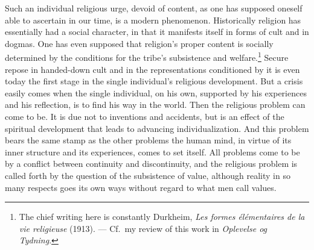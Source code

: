 \documentclass[12pt]{book}
\newcommand{\opage}[1]{\marginnote{\footnotesize\textit{[#1]}}}
\begin{document}
Such an individual religious urge, devoid of content, as one has supposed oneself able to ascertain in our
time, is a modern phenomenon. Historically religion has essentially had a social character, in that it manifests
itself in forms of cult and in dogmas. One has even supposed that religion's proper content is
socially determined by the conditions for the tribe's subsistence and welfare.\footnote{The chief writing here
is constantly Durkheim, \textit{Les formes élémentaires de la vie religieuse} (1913). --- Cf.\ my review of
this work in \textit{Oplevelse og Tydning}.} Secure repose in handed-down cult and in the representations
conditioned by it is even today the first stage in the single individual's religious development. But a crisis
easily comes when the single individual, on his own, supported by his experiences and his reflection, is to
find his way in the world. Then the religious problem can come to be. It is due not to inventions and
accidents, but is an effect of the spiritual development that leads to advancing individualization. And \opage{107}this
problem bears the same stamp as the other problems the human mind, in virtue of its inner structure and its
experiences, comes to set itself. All problems come to be by a conflict between continuity and discontinuity,
and the religious problem is called forth by the question of the subsistence of value, although reality in so
many respects goes its own ways without regard to what men call values.
\end{document}
